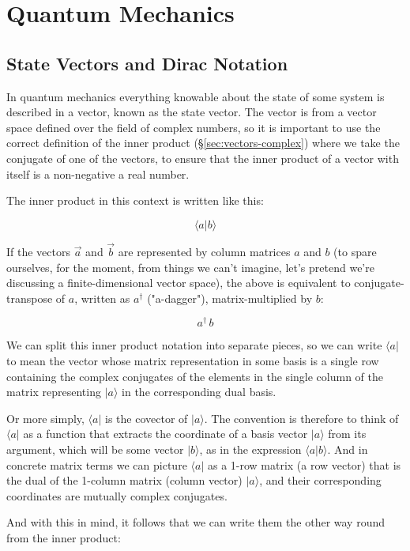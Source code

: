 \chapter{Quantum Mechanics} \label{ch:qm}

\section{State Vectors and Dirac Notation}

In quantum mechanics everything knowable about the state of some system is described in a vector, known as the state vector. The vector is from a vector space defined over the field of complex numbers, so it is important to use the correct definition of the inner product (§\ref{sec:vectors-complex}) where we take the conjugate of one of the vectors, to ensure that the inner product of a vector with itself is a non-negative a real number.

The inner product in this context is written like this:

$$\langle a|b \rangle$$

If the vectors $\vec{a}$ and $\vec{b}$ are represented by column matrices $a$ and $b$ (to spare ourselves, for the moment, from things we can't imagine, let's pretend we're discussing a finite-dimensional vector space), the above is equivalent to conjugate-transpose of $a$, written as $a^{\dagger}$ ("a-dagger"), matrix-multiplied by $b$:

$$a^{\dagger} \, b$$

We can split this inner product notation into separate pieces, so we can write $\langle a|$ to mean the vector whose matrix representation in some basis is a single row containing the complex conjugates of the elements in the single column of the matrix representing $|a \rangle$ in the corresponding dual basis.

Or more simply, $\langle a|$ is the covector of $|a \rangle$. The convention is therefore to think of $\langle a|$ as a function that extracts the coordinate of a basis vector $|a \rangle$ from its argument, which will be some vector $|b \rangle$, as in the expression $\langle a|b \rangle$. And in concrete matrix terms we can picture $\langle a|$ as a 1-row matrix (a row vector) that is the dual of the 1-column matrix (column vector) $|a \rangle$, and their corresponding coordinates are mutually complex conjugates.

And with this in mind, it follows that we can write them the other way round from the inner product:

